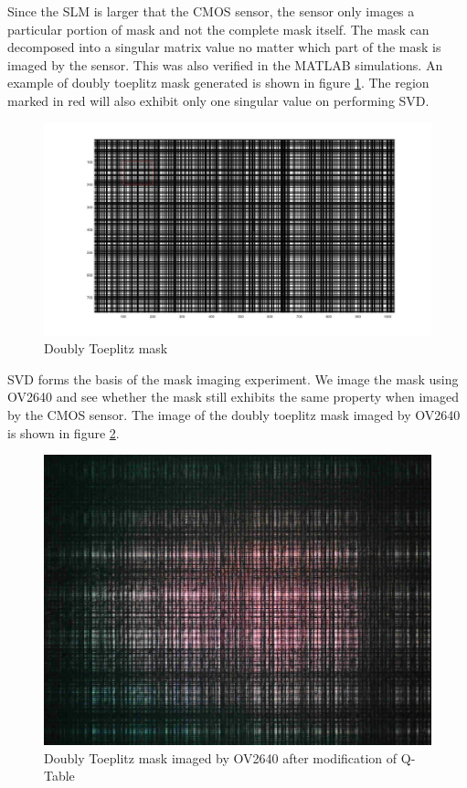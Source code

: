  Since the SLM is larger that the CMOS sensor, the sensor only images a particular portion of mask and not the complete mask itself.
The mask can decomposed into a singular matrix value no matter which part of the mask is imaged by the sensor. This was also verified in the MATLAB simulations. An example of doubly toeplitz mask generated is shown in figure \ref{fig:doubly_toepl_custom}. The region marked in red will also exhibit only one singular value on performing SVD.
\begin{figure}[h]
\centering
\includegraphics[scale=0.20]{pics/slm/mask_sub_prop.jpg}
\caption{Doubly Toeplitz mask}
\label{fig:doubly_toepl_custom}
\end{figure}
SVD forms the basis of the mask imaging experiment. We image the mask using OV2640 and see whether the mask still exhibits the same property when imaged by the CMOS sensor. The image of the doubly toeplitz mask imaged by OV2640 is shown in figure \ref{fig:dt_ov2640}.
\begin{figure}[h]
\centering
\includegraphics[scale=0.20]{pics/slm/ov2640dtmask.jpg}
\caption{Doubly Toeplitz mask imaged by OV2640 after modification of Q-Table}
\label{fig:dt_ov2640}
\end{figure}
